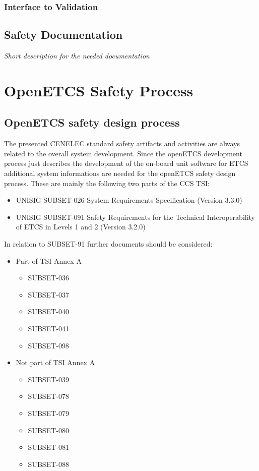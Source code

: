 \documentclass{template/openetcs_report}
\begin{document}
\subsection{Interface to Validation}

\section{Safety Documentation}

\textit{Short description for the needed documentation}

\chapter{OpenETCS Safety Process}

\section{OpenETCS safety design process}

The presented CENELEC standard safety artifacts and activities are always related to the overall system development. Since the openETCS development process just describes the development of the on-board unit software for ETCS additional system informations are needed for the openETCS safety design process. These are mainly the following two parts of the CCS TSI:

\begin{itemize}
\item UNISIG SUBSET-026	System Requirements Specification 	(Version 3.3.0)
\item UNISIG SUBSET-091 Safety Requirements for the Technical Interoperability of ETCS in Levels 1 and 2 	(Version 3.2.0)
\end{itemize}

In relation to SUBSET-91 further documents should be considered:

\begin{itemize}
\item Part of TSI Annex A
	\begin{itemize}
	\item SUBSET-036
	\item SUBSET-037
	\item SUBSET-040
	\item SUBSET-041
	\item SUBSET-098
	\end{itemize}
	
\item Not part of TSI Annex A
	\begin{itemize}
	\item SUBSET-039
	\item SUBSET-078
	\item SUBSET-079
	\item SUBSET-080
	\item SUBSET-081
	\item SUBSET-088
	\end{itemize}
\end{itemize}
\end{document}
